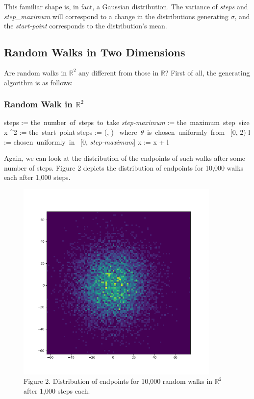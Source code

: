\documentclass{article}
\begin{document}
  This familiar shape is, in fact, a Gaussian distribution. The variance of \textit{steps} and \textit{step_maximum} will correspond to a change in the distributions generating $  \sigma  $, and the \textit{start-point} corresponds to the distribution's mean.


\subsection{Random Walks in Two Dimensions}


  Are random walks in $  \mathbb{R}^2  $ any different from those in $  \mathbb{R}  $? First of all, the generating algorithm is as follows:



  \vspace{0.4cm}
  \subsubsection*{Random Walk in $\mathbb{R}^2$}

\begin{adjustwidth}{1cm}{}\begin{programbox}
steps := \mbox{the number of steps to take}
\textit{step-maximum} := \mbox{the maximum step size}
x \in {}^2 := \mbox{the start point}
 \TO steps \DO
  \vec{\theta} := (\cos \theta, \sin \theta) \mbox{ where $\theta$ is chosen uniformly from } [0, 2\pi)
  l := \mbox{chosen uniformly in } [0, \textit{step-maximum}]
  x := x + l \vec{\theta}
\OD
\end{programbox}\end{adjustwidth}
 \vspace{0.6cm}


  Again, we can look at the distribution of the endpoints of such walks after some number of steps. Figure 2 depicts the distribution of endpoints for 10,000 walks each after 1,000 steps.



\begin{figure}[h]
\centering
\includegraphics[width=10cm,keepaspectratio]{images/walk2d-hist.png}
\captionsetup{labelformat=empty} \caption{Figure 2. Distribution of endpoints for 10,000 random walks in $\mathbb{R}^2$ after 1,000 steps each.}
\end{figure}
\end{document}
